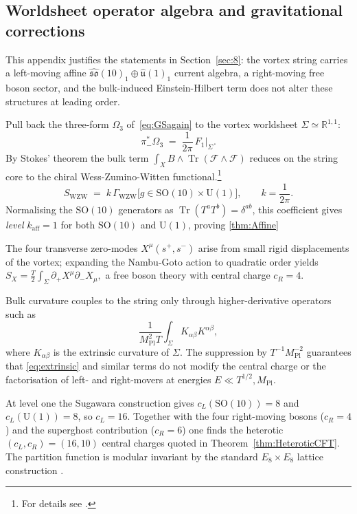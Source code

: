 \documentclass[pdflatex,sn-mathphys-num]{sn-jnl}
\theoremstyle{thmstyleone}
\theoremstyle{thmstyletwo}%
\theoremstyle{thmstylethree}%
\newcommand{\SO}[1]{\mathrm{SO(#1)}}
\newcommand{\U}[1]{\mathrm{U(#1)}}
\newcommand{\SOTen}{\SO{10}}
\newcommand{\UOne}{\U{1}}
\newcommand{\Tr}{\operatorname{Tr}}
\begin{document}
\begin{appendices}
\section{Worldsheet operator algebra and gravitational corrections}
\label{app:WS}
This appendix justifies the statements in
Section~\ref{sec:8}: the vortex string carries a
left-moving affine $\widehat{\mathfrak{so}}(10)_{1}\oplus
\widehat{\mathfrak u}(1)_{1}$ current algebra, a right-moving free
boson sector, and the bulk-induced Einstein-Hilbert term does not alter
these structures at leading order.

Pull back the three-form $\Omega_{3}$ of~\eqref{eq:GSagain} to the
vortex worldsheet $\Sigma\simeq\mathbb R^{1,1}$:
\[
  \pi_{-}^{*}\Omega_{3}
  \;=\;
  \frac{1}{2\pi}\,F_{1}|_{\Sigma}.
\]
By Stokes’ theorem the bulk term
\(
  \int_{X}B\wedge\Tr(\mathcal F\wedge\mathcal F)
\)
reduces on the string core to the chiral
Wess-Zumino-Witten functional.\footnote{%
For details see
\cite{CallanHarveyStrominger:1991}.}
\[
  S_{\text{WZW}}\;=\;
  k\,
  \Gamma_{\text{WZW}}\bigl[g\in \SOTen\times \UOne\bigr],
  \qquad
  k=\frac{1}{2\pi}.
\]
Normalising the $\SOTen$ generators as
$\Tr(T^{a}T^{b})=\delta^{ab}$, this coefficient gives
\emph{level} $k_{\mathrm{aff}}=1$ for both $\SOTen$ and
$\UOne$, proving \autoref{thm:Affine}

The four transverse zero-modes $X^{\mu}(s^{+},s^{-})$ arise from
small rigid displacements of the vortex; expanding the Nambu-Goto
action to quadratic order yields
\(
  S_{X}=\frac{T}{2}\int_{\Sigma}\partial_{+}X^{\mu}\partial_{-}X_{\mu},
\)
a free boson theory with central charge $c_{R}=4$.

Bulk curvature couples to the string only through higher-derivative
operators such as
\[
  \frac{1}{M_{\text{Pl}}^{2}T}
  \int_{\Sigma}K_{\alpha\beta}K^{\alpha\beta},
\tag{WS.1}\label{eq:extrinsic}
\]
where \(K_{\alpha\beta}\) is the extrinsic curvature of $\Sigma$.  The
suppression by \(T^{-1}M_{\text{Pl}}^{-2}\) guarantees that
\eqref{eq:extrinsic} and similar terms do not modify the central charge
or the factorisation of left- and right-movers at energies
$E\ll T^{1/2},M_{\text{Pl}}$.

At level one the Sugawara construction gives
\(c_{L}(\SOTen)=8\) and \(c_{L}(\UOne)=8\),
so \(c_{L}=16\).  Together with the four right-moving bosons
(\(c_{R}=4\)) and the superghost contribution (\(c_{R}=6\))
one finds the heterotic
\((c_{L},c_{R})=(16,10)\) central charges quoted in
Theorem~\ref{thm:HeteroticCFT}.  The partition function is modular
invariant by the standard \(E_{8}\times E_{8}\) lattice construction
\cite{Narain:1986}.


\end{appendices}
\end{document}
